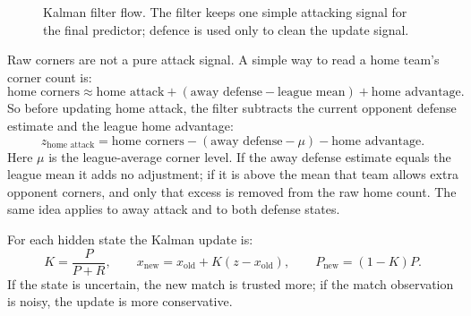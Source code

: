\documentclass[11pt]{article}
\begin{document}
\begin{figure}[h]
\centering
{}
\caption{Kalman filter flow. The filter keeps one simple attacking signal for
the final predictor; defence is used only to clean the update signal.}
\end{figure}

Raw corners are not a pure attack signal. A simple way to read a home team's
corner count is:
\[
\text{home corners}
\approx
\text{home attack}
+(\text{away defense}-\text{league mean})
+\text{home advantage}.
\]
So before updating home attack, the filter subtracts the current opponent
defense estimate and the league home advantage:
\[
z_{\text{home attack}}
=
\text{home corners}
-(\text{away defense}-\mu)
-\text{home advantage}.
\]
Here \(\mu\) is the league-average corner level. If the away defense estimate
equals the league mean it adds no adjustment; if it is above the mean that team
allows extra opponent corners, and only that excess is removed from the raw home
count. The same idea applies to away attack and to both defense states.

For each hidden state the Kalman update is:
\[
K = \frac{P}{P+R},
\qquad
x_{\text{new}} = x_{\text{old}} + K(z-x_{\text{old}}),
\qquad
P_{\text{new}} = (1-K)P.
\]
If the state is uncertain, the new match is trusted more; if the match
observation is noisy, the update is more conservative.
\end{document}
